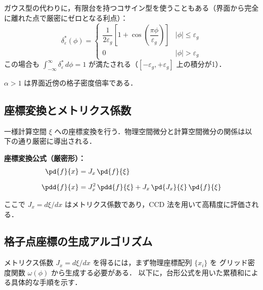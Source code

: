 \begin{tcolorbox}[warnbox, title={代替定義：コサイン型スムーズデルタ関数}]
ガウス型の代わりに，有限台を持つコサイン型を使うこともある（界面から完全に離れた点で厳密にゼロとなる利点）：
\[
  \delta_\varepsilon^*(\phi) =
  \begin{cases}
    \dfrac{1}{2\varepsilon_g}\left[1 + \cos\!\left(\dfrac{\pi\phi}{\varepsilon_g}\right)\right] & |\phi| \le \varepsilon_g \\[6pt]
    0 & |\phi| > \varepsilon_g
  \end{cases}
\]
この場合も $\int_{-\infty}^{\infty}\delta_\varepsilon^*\,d\phi = 1$ が満たされる（$[-\varepsilon_g,+\varepsilon_g]$ 上の積分が1）．
\end{tcolorbox}

$\alpha > 1$ は界面近傍の格子密度倍率である．

\subsection{座標変換とメトリクス係数}

一様計算空間 $\xi$ への座標変換を行う．物理空間微分と計算空間微分の関係は以下の通り厳密に導出される．

\begin{tcolorbox}[resultbox]
\textbf{座標変換公式（厳密形）：}
\begin{align}
 \pd{f}{x} &= J_x\,\pd{f}{\xi}
 \label{eq:transform_1st_correct} \\[6pt]
 \pdd{f}{x} &= J_x^2\,\pdd{f}{\xi} + J_x\,\pd{J_x}{\xi}\,\pd{f}{\xi}
 \label{eq:transform_2nd_correct}
\end{align}
\end{tcolorbox}
ここで $J_x = d\xi/dx$ はメトリクス係数であり，CCD 法を用いて高精度に評価される．

\subsection{格子点座標の生成アルゴリズム}
\label{sec:grid_gen}

メトリクス係数 $J_x = d\xi/dx$ を得るには，まず物理座標配列 $\{x_i\}$ を
グリッド密度関数 $\omega(\phi)$ から生成する必要がある．
以下に，台形公式を用いた累積和による具体的な手順を示す．

